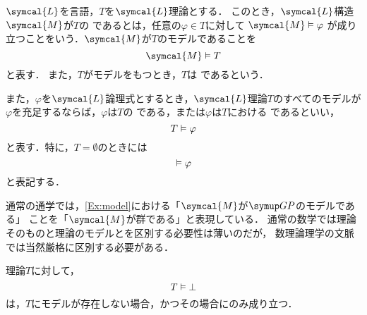 \begin{Def} \label{Def:model}
	\(\symcal{L}\)を言語，\(T\)を\(\symcal{L}\)理論とする．
	このとき，\(\symcal{L}\)構造\(\symcal{M}\)が\(T\)の%
	であるとは，任意の\(\varphi \in T\)に対して
	\(\symcal{M} \satisfy \varphi\)
	が成り立つことをいう．\(\symcal{M}\)が\(T\)のモデルであることを%
	\begin{equation}
		\symcal{M} \satisfy T
		\label{eq:model}
	\end{equation}
	と表す．
	また，\(T\)がモデルをもつとき，\(T\)は%
	であるという．

	また，\(\varphi\)を\(\symcal{L}\)論理式とするとき，\(\symcal{L}\)理論\(T\)のすべてのモデルが
	\(\varphi\)を充足するならば，\(\varphi\)は\(T\)の%
	である，または\(\varphi\)は\(T\)における%
	であるといい，
	\begin{equation}
		T \vDash \varphi
		\label{eq:logicalconsequence}
	\end{equation}
	と表す．特に，\(T = \emptyset\)のときには
	\begin{equation}
		\vDash \varphi
		\label{eq:nulllogicalconsequence}
	\end{equation}
	と表記する．
\end{Def}


\begin{Note}
	通常の通学では，\cref{Ex:model}における「\(\symcal{M}\)が\(\GP\)のモデルである」
	ことを「\(\symcal{M}\)が群である」と表現している．
	通常の数学では理論そのものと理論のモデルとを区別する必要性は薄いのだが，
	数理論理学の文脈では当然厳格に区別する必要がある．
\end{Note}

\begin{Note}
	理論\(T\)に対して，
	\[
		T \vDash \bot
	\]
	は，\(T\)にモデルが存在しない場合，かつその場合にのみ成り立つ．
\end{Note}


